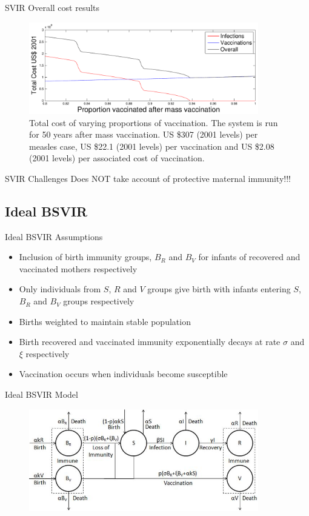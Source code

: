 \documentclass{beamer}
\begin{document}
\begin{frame} {SVIR} {Overall cost results}
\begin{figure}
\centering
\includegraphics[width=100mm]{figproportionSVIRcost80to100}
\caption{Total cost of varying proportions of vaccination. The system is run for 50 years after mass vaccination. US \$307 (2001 levels) per measles case, US \$22.1 (2001 levels) per vaccination and US \$2.08 (2001 levels) per associated cost of vaccination.}
\end{figure}
\end{frame}

\begin{frame} {SVIR} {Challenges}
Does NOT take account of protective maternal immunity!!!
\end{frame}

\subsection{Ideal BSVIR}
\begin{frame} {Ideal BSVIR} {Assumptions}
\begin{itemize}
\item {Inclusion of birth immunity groups, $B_R$ and $B_V$ for infants of recovered and vaccinated mothers respectively}
 \item{Only individuals from $S$, $R$ and $V$ groups give birth with infants entering $S$, $B_R$ and $B_V$ groups respectively}
 \item{Births weighted to maintain stable population}
 \item{Birth recovered and vaccinated immunity exponentially decays at rate $\sigma$ and $\xi$ respectively}
 \item{Vaccination occurs when individuals become susceptible}
\end{itemize}
\end{frame}

\begin{frame} {Ideal BSVIR} {Model}
\begin{figure}
\centering
\includegraphics[width=100mm]{IdealBSVIRmodel.jpg}
\end{figure}
\end{frame}
\end{document}
